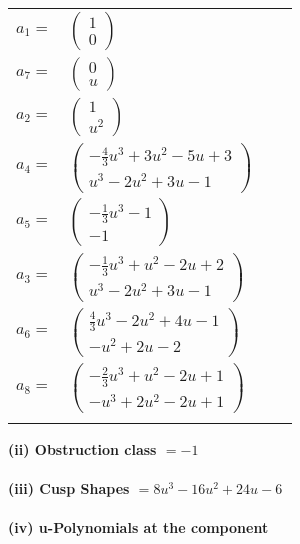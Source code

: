 \documentclass[1p]{elsarticle_modified}
\theoremstyle{definition}
\begin{document}
\begin{tabular}{m{7pt} m{180pt} m{7pt} m{180pt} }
\flushright $a_{1}=$&$\begin{pmatrix}1\\0\end{pmatrix}$ \\
\flushright $a_{7}=$&$\begin{pmatrix}0\\u\end{pmatrix}$ \\
\flushright $a_{2}=$&$\begin{pmatrix}1\\u^2\end{pmatrix}$ \\
\flushright $a_{4}=$&$\begin{pmatrix}-\frac{4}{3} u^3+3 u^2-5 u+3\\u^3-2 u^2+3 u-1\end{pmatrix}$ \\
\flushright $a_{5}=$&$\begin{pmatrix}-\frac{1}{3} u^3-1\\-1\end{pmatrix}$ \\
\flushright $a_{3}=$&$\begin{pmatrix}-\frac{1}{3} u^3+u^2-2 u+2\\u^3-2 u^2+3 u-1\end{pmatrix}$ \\
\flushright $a_{6}=$&$\begin{pmatrix}\frac{4}{3} u^3-2 u^2+4 u-1\\- u^2+2 u-2\end{pmatrix}$ \\
\flushright $a_{8}=$&$\begin{pmatrix}-\frac{2}{3} u^3+u^2-2 u+1\\- u^3+2 u^2-2 u+1\end{pmatrix}$\\&\end{tabular}
\flushleft \textbf{(ii) Obstruction class $= -1$}\\~\\
\flushleft \textbf{(iii) Cusp Shapes $= 8 u^3-16 u^2+24 u-6$}\\~\\
\newpage\renewcommand{\arraystretch}{1}
\flushleft \textbf{(iv) u-Polynomials at the component}\newline \\
\end{document}
